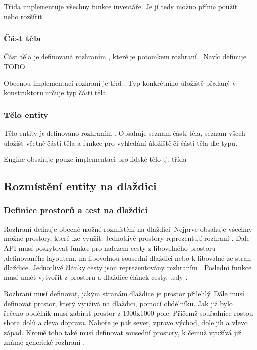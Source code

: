 Třída  implementuje všechny funkce inventáře. Je jí tedy možno přímo použít nebo rozšířit.

\subsubsection{Část těla}
Část těla je definovaná rozhraním , které je potomkem rozhraní . Navíc definuje TODO

Obecnou implementací rozhraní je tříd . Typ konkrétního úložiště předaný v konstruktoru určuje typ části těla. 

\subsubsection{Tělo entity}
Tělo entity je definováno rozhraním .  Obsahuje seznam částí těla, seznam všech úložišť včetně částí těla a funkce pro vyhledání 
úložiště či části těla dle typu. 

Engine obsahuje pouze implementaci pro lidské tělo tj. třída 

\subsection{Rozmístění entity na dlaždici}
\subsubsection{Definice prostorů a cest na dlaždici}
Rozhraní  definuje obecně možné rozmístění na dlaždici. Nejprve obsahuje všechny možné prostory, které lze využít.
 Jednotlivě prostory reprezentují rozhraní . Dale API musí poskytovat funkce pro nalezení cesty z libovolného prostoru
 ,definovaného layoutem, na libovolnou sousední dlaždici nebo k libovolné ze stran dlaždice. Jednotlivé články cesty jsou 
 reprezentovány rozhraním . Poslední funkce musí umět vytvořit z prostoru a dlaždice článek cesty,
 tedy .  

Rozhraní  musí definovat, jakým stranám dlaždice je prostor přilehlý. Dále musí definovat prostor, který využívá
na dlaždici,  pomocí obdélníku. Jak již bylo řečeno obdélník musí zabírat prostor z 1000x1000 pole. Přičemž souřadnice rostou
shora dolů a zleva doprava. Nahoře je pak sever, vpravo východ, dole jih a vlevo západ. Kromě toho také musí definovat sousední
prostory, k čemuž využívá již známé generické rozhraní .

